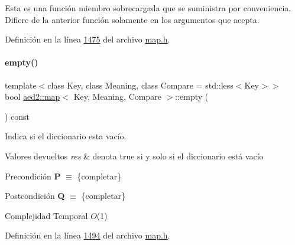 Esta es una función miembro sobrecargada que se suministra por conveniencia. Difiere de la anterior función solamente en los argumentos que acepta. 

Definición en la línea \hyperlink{map_8h_source_l01475}{1475} del archivo \hyperlink{map_8h_source}{map.\+h}.

\mbox{\label{classaed2_1_1map_a0dcb39283f4877ae59cb756ed1d0c048_a0dcb39283f4877ae59cb756ed1d0c048}} 
\paragraph{\texorpdfstring{empty()}{empty()}}
{\footnotesize\ttfamily template$<$class Key, class Meaning, class Compare = std\+::less$<$\+Key$>$$>$ \\
bool \hyperlink{classaed2_1_1map}{aed2\+::map}$<$ Key, Meaning, Compare $>$\+::empty (\begin{DoxyParamCaption}{ }\end{DoxyParamCaption}) const\hspace{0.3cm}{\ttfamily [inline]}}



Indica si el diccionario esta vacío. 


\begin{DoxyRetVals}{Valores devueltos}
{\em res} & denota true si y solo si el diccionario está vacío\\
\hline
\end{DoxyRetVals}
\begin{DoxyPrecond}{Precondición}
{\bfseries P} $\equiv$ \{completar\} 
\end{DoxyPrecond}
\begin{DoxyPostcond}{Postcondición}
{\bfseries Q} $\equiv$ \{completar\}
\end{DoxyPostcond}

\begin{DoxyDescription}
\item[Complejidad Temporal]$O$(1)
\end{DoxyDescription}

Definición en la línea \hyperlink{map_8h_source_l01494}{1494} del archivo \hyperlink{map_8h_source}{map.\+h}.

\mbox{\label{classaed2_1_1map_aa6e806b3be6dc0da79adbfae08b571bf_aa6e806b3be6dc0da79adbfae08b571bf}} 
